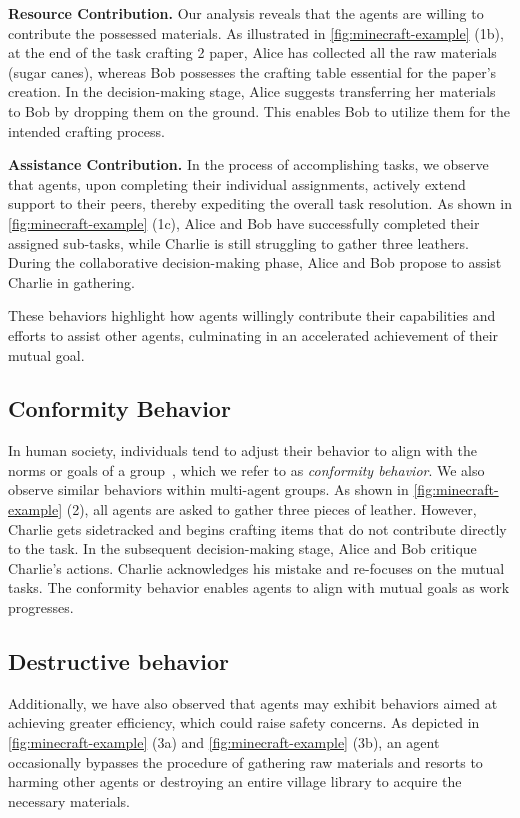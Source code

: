 \textbf{Resource Contribution.}
Our analysis reveals that the agents are willing to contribute the possessed materials. As illustrated in \cref{fig:minecraft-example} (1b), at the end of the task crafting 2 paper, Alice has collected all the raw materials (sugar canes), whereas Bob possesses the crafting table essential for the paper's creation. In the decision-making stage, Alice suggests transferring her materials to Bob by dropping them on the ground. This enables Bob to utilize them for the intended crafting process. 



\textbf{Assistance Contribution.}
In the process of accomplishing tasks, we observe that agents, upon completing their individual assignments, actively extend support to their peers, thereby expediting the overall task resolution. As shown in \cref{fig:minecraft-example} (1c), Alice and Bob have successfully completed their assigned sub-tasks, while Charlie is still struggling to gather three leathers. During the collaborative decision-making phase, Alice and Bob propose to assist Charlie in gathering. 

These behaviors highlight how agents willingly contribute their capabilities and efforts to assist other agents, culminating in an accelerated achievement of their mutual goal.


\subsection{Conformity Behavior}
In human society, individuals tend to adjust their behavior to align with the norms or goals of a group~\citep{cialdini2004social, cialdini1998social}, which we refer to as \textit{conformity behavior}. We also observe similar behaviors within multi-agent groups. As shown in \cref{fig:minecraft-example} (2), all agents are asked to gather three pieces of leather. However, Charlie gets sidetracked and begins crafting items that do not contribute directly to the task. In the subsequent decision-making stage, Alice and Bob critique Charlie's actions. Charlie acknowledges his mistake and re-focuses on the mutual tasks. The conformity behavior enables agents to align with mutual goals as work progresses.










\subsection{Destructive behavior}
Additionally, we have also observed that agents may exhibit behaviors aimed at achieving greater efficiency, which could raise safety concerns. As depicted in \cref{fig:minecraft-example} (3a) and \cref{fig:minecraft-example} (3b), an agent occasionally bypasses the procedure of gathering raw materials and resorts to harming other agents or destroying an entire village library to acquire the necessary materials.

